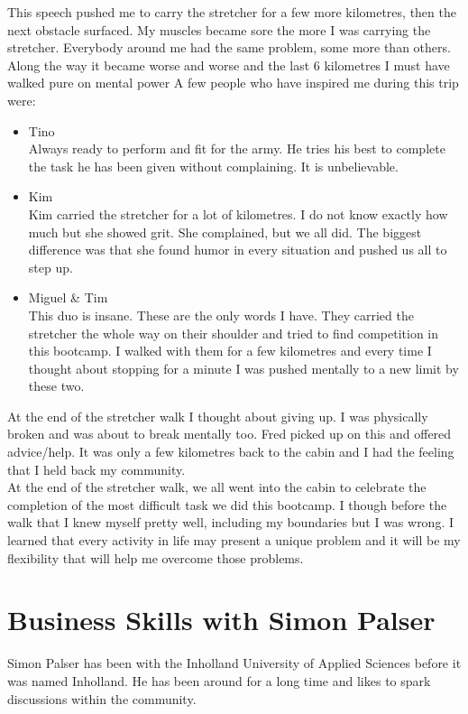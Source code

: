 \documentclass{article}
\begin{document}
This speech pushed me to carry the stretcher for a few more kilometres, then the next obstacle surfaced. My muscles became sore the more I was carrying the stretcher. Everybody around me had the same problem, some more than others. Along the way it became worse and worse and the last 6 kilometres I must have walked pure on mental power
\newpage
A few people who have inspired me during this trip were:
\begin{itemize}
	\item Tino\\
	Always ready to perform and fit for the army. He tries his best to complete the task he has been given without complaining. It is unbelievable.
	\item Kim\\
	Kim carried the stretcher for a lot of kilometres. I do not know exactly how much but she showed grit. She complained, but we all did. The biggest difference was that she found humor in every situation and pushed us all to step up.
	\item Miguel \& Tim\\
	This duo is insane. These are the only words I have. They carried the stretcher the whole way on their shoulder and tried to find competition in this bootcamp. I walked with them for a few kilometres and every time I thought about stopping for a minute I was pushed mentally to a new limit by these two. 
\end{itemize}  

At the end of the stretcher walk I thought about giving up. I was physically broken and was about to break mentally too. Fred picked up on this and offered advice/help. It was only a few kilometres back to the cabin and I had the feeling that I held back my community. \\

At the end of the stretcher walk, we all went into the cabin to celebrate the completion of the most difficult task we did this bootcamp. I though before the walk that I knew myself pretty well, including my boundaries but I was wrong. I learned that every activity in life may present a unique problem and it will be my flexibility that will help me overcome those problems.

\newpage
\section{Business Skills with Simon Palser}

Simon Palser has been with the Inholland University of Applied Sciences before it was named Inholland. He has been around for a long time and likes to spark discussions within the community. \\ 
\end{document}
